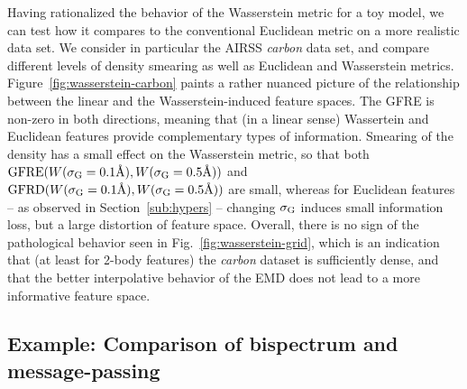 Having rationalized the behavior of the Wasserstein metric for a toy model, we can test how it compares to the conventional Euclidean metric on a more realistic data set. We consider in particular the AIRSS \emph{carbon} data set, and compare different levels of density smearing as well as Euclidean and Wasserstein metrics. 
Figure~\ref{fig:wasserstein-carbon} paints a rather nuanced picture of the relationship between the linear and the Wasserstein-induced feature spaces. 
The GFRE is non-zero in both directions, meaning that (in a linear sense) Wassertein and Euclidean features provide complementary types of information. 
Smearing of the density has a small effect on the Wasserstein metric, so that both $\operatorname{GFRE}(W(\sigma_\text{G}=0.1\text{\AA}),W(\sigma_\text{G}=0.5\text{\AA}))$ and $\operatorname{GFRD}(W(\sigma_\text{G}=0.1\text{\AA}),W(\sigma_\text{G}=0.5\text{\AA}))$ are small, whereas for Euclidean features -- as observed in Section~\ref{sub:hypers} -- changing $\sigma_\text{G}$ induces small information loss, but a large distortion of feature space. 
Overall, there is no sign of the pathological behavior seen in Fig.~\ref{fig:wasserstein-grid}, which is an indication that (at least for 2-body features) the \emph{carbon} dataset is sufficiently dense, and that the better interpolative behavior of the EMD does not lead to a more informative feature space. 

\subsection{Example: Comparison of bispectrum and message-passing}

